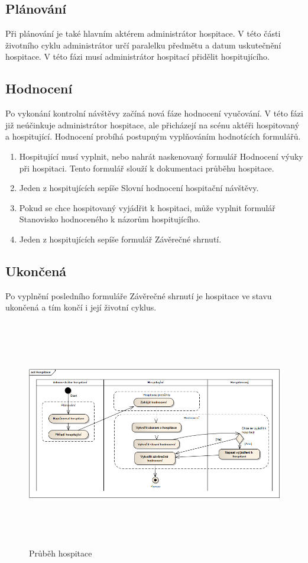 \subsection{Plánování}
Při plánování je také hlavním aktérem administrátor hospitace. V této části životního cyklu administrátor určí paralelku předmětu a datum uskutečnění hospitace. V této fázi musí administrátor hospitací přidělit hospitujícího.  
 
\subsection{Hodnocení}
Po vykonání kontrolní návštěvy začíná nová fáze hodnocení vyučování. V této fázi již neúčinkuje administrátor hospitace, ale přicházejí na scénu aktéři hospitovaný a hospitující. Hodnocení probíhá postupným vyplňováním hodnotících formulářů. 
\begin{enumerate}
\item Hospitující musí vyplnit, nebo nahrát naskenovaný formulář Hodnocení výuky při hospitaci. Tento formulář slouží k dokumentaci průběhu hospitace.
\item Jeden z hospitujících sepíše Slovní hodnocení hospitační návštěvy.
\item Pokud se chce hospitovaný vyjádřit k hospitaci, může vyplnit formulář Stanovisko hodnoceného k názorům hospitujícího.
\item Jeden z hospitujících sepíše formulář Závěrečné shrnutí.
\end{enumerate}

\subsection{Ukončená}
Po vyplnění posledního formuláře Závěrečné shrnutí je hospitace ve stavu ukončená a tím končí i její životní cyklus.

\begin{figure}[h]
\begin{center}
\includegraphics[height=10cm,angle=270]{figures/hospitace}
\caption{Průběh hospitace}
\label{fig:hospitace}
\end{center}
\end{figure}
